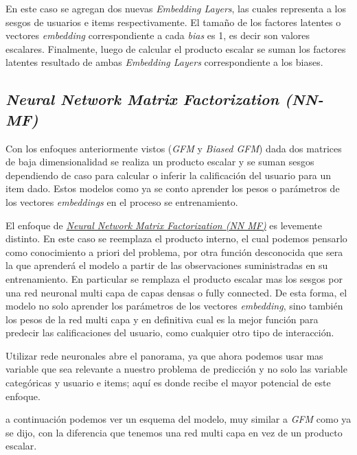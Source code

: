\documentclass[11pt,a4paper,twoside]{thesis}
\begin{document}
En este caso se agregan dos nuevas \textit{Embedding Layers}, las cuales representa a los sesgos de usuarios e items respectivamente. El tamaño de los factores latentes o vectores \textit{embedding} correspondiente a cada \textit{bias} es 1, es decir son valores escalares. Finalmente, luego de calcular el producto escalar se suman los factores latentes resultado de ambas \textit{Embedding Layers} correspondiente a los biases.  


\clearpage

\subsection{\textit{Neural Network Matrix Factorization (NN-MF)}}

Con los enfoques anteriormente vistos (\textit{GFM} y \textit{Biased GFM}) dada dos matrices de baja dimensionalidad se realiza un producto escalar y se suman sesgos dependiendo de caso para calcular o inferir la calificación del usuario para un item dado. Estos modelos como ya se conto aprender los pesos o parámetros de los vectores \textit{embeddings} en el proceso se entrenamiento. 

El enfoque de \href{https://arxiv.org/pdf/1511.06443.pdf}{\textit{Neural Network Matrix Factorization (NN MF)}} es levemente distinto. En este caso se reemplaza el producto interno, el cual podemos pensarlo como conocimiento a priori del problema, por otra función desconocida que sera la que aprenderá el modelo a partir de las observaciones suministradas en su entrenamiento. En particular se remplaza el producto escalar mas los sesgos por una red neuronal multi capa de capas densas o fully connected. De esta forma, el modelo no solo aprender los parámetros de los vectores \textit{embedding}, sino también los pesos de la red multi capa y en definitiva cual es la mejor función para predecir las calificaciones del usuario, como cualquier otro tipo de interacción.

Utilizar rede neuronales abre el panorama, ya que ahora podemos usar mas variable que sea relevante a nuestro problema de predicción y no solo las variable categóricas y usuario e items; aquí es donde recibe el mayor potencial de este enfoque.

a continuación podemos ver un esquema del modelo, muy similar a \textit{GFM} como ya se dijo, con la diferencia que tenemos una red multi capa en vez de un producto escalar.
\end{document}
